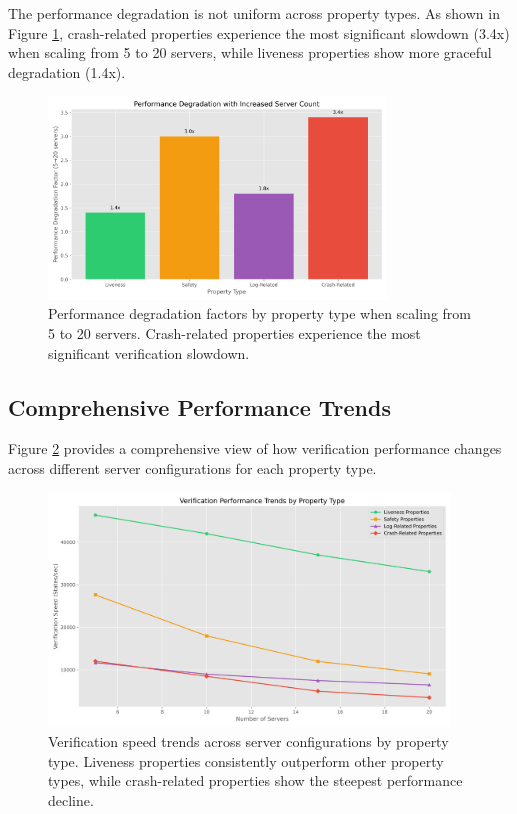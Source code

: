 The performance degradation is not uniform across property types. As shown in Figure \ref{fig:performance-degradation}, crash-related properties experience the most significant slowdown (3.4x) when scaling from 5 to 20 servers, while liveness properties show more graceful degradation (1.4x).

\begin{figure}[htbp]
    \centering
    \includegraphics[width=0.8\textwidth]{graphs/performance_degradation.png}
    \caption{Performance degradation factors by property type when scaling from 5 to 20 servers. Crash-related properties experience the most significant verification slowdown.}
    \label{fig:performance-degradation}
\end{figure}

\subsection{Comprehensive Performance Trends}

Figure \ref{fig:performance-trends} provides a comprehensive view of how verification performance changes across different server configurations for each property type.

\begin{figure}[htbp]
    \centering
    \includegraphics[width=0.95\textwidth]{graphs/performance_trends.png}
    \caption{Verification speed trends across server configurations by property type. Liveness properties consistently outperform other property types, while crash-related properties show the steepest performance decline.}
    \label{fig:performance-trends}
\end{figure}

